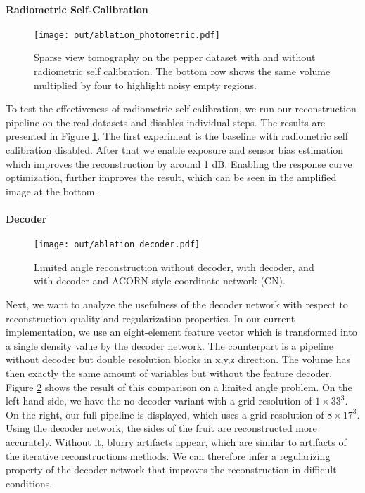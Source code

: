 \documentclass[acmtog,nonacm]{acmart} \acmSubmissionID{0438}
\begin{document}
\paragraph{Radiometric Self-Calibration}
\begin{figure}
\texttt{[image: out/ablation\_photometric.pdf]}
	\caption{
		Sparse view tomography on the pepper dataset with and without radiometric self calibration.
		The bottom row shows the same volume multiplied by four to highlight noisy empty regions.	
	}
	\label{fig:photomeric}
\end{figure}
To test the effectiveness of radiometric self-calibration, we run our reconstruction pipeline on the real datasets and disables individual steps.
The results are presented in Figure \ref{fig:photomeric}.
The first experiment is the baseline with radiometric self calibration disabled.
After that we enable exposure and sensor bias estimation which improves the reconstruction by around 1 dB.
Enabling the response curve optimization, further improves the result, which can be seen in the amplified image at the bottom.


\paragraph{Decoder}
\begin{figure}
\texttt{[image: out/ablation\_decoder.pdf]}
	\caption{
		Limited angle reconstruction without decoder, with decoder, and with decoder and ACORN-style coordinate network (CN).
	}
	\label{fig:decoder}
\end{figure}
Next, we want to analyze the usefulness of the decoder network with respect to reconstruction quality and regularization properties.
In our current implementation, we use an eight-element feature vector which is transformed into a single density value by the decoder network.
The counterpart is a pipeline without decoder but double resolution blocks in x,y,z direction.
The volume has then exactly the same amount of variables but without the feature decoder.
Figure \ref{fig:decoder} shows the result of this comparison on a limited angle problem.
On the left hand side, we have the no-decoder variant with a grid resolution of $1\times33^3$. 
On the right, our full pipeline is displayed, which uses a grid resolution of $8\times17^3$. 
Using the decoder network, the sides of the fruit are reconstructed more accurately.
Without it, blurry artifacts appear, which are similar to artifacts of the iterative reconstructions methods.
We can therefore infer a regularizing property of the decoder network that improves the reconstruction in difficult conditions.
\end{document}
